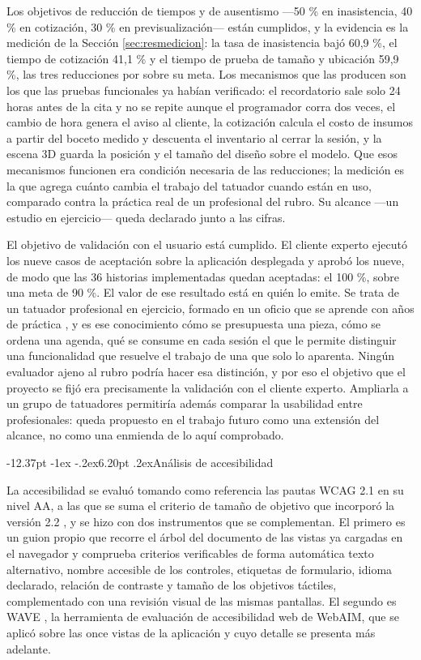 \documentclass[12pt,letterpaper,oneside]{report}
\makeatletter
\renewcommand\section{\@startsection{section}{1}{\z@}%
  {-12.37pt \@plus -1ex \@minus -.2ex}{6.20pt \@plus.2ex}{\normalfont\large\bfseries}}
\makeatother
\begin{document}
Los objetivos de reducción de tiempos y de ausentismo —50 \% en inasistencia, 40 \% en cotización, 30 \% en previsualización— están cumplidos, y la evidencia es la medición de la Sección \ref{sec:resmedicion}: la tasa de inasistencia bajó 60,9 \%, el tiempo de cotización 41,1 \% y el tiempo de prueba de tamaño y ubicación 59,9 \%, las tres reducciones por sobre su meta. Los mecanismos que las producen son los que las pruebas funcionales ya habían verificado: el recordatorio sale solo 24 horas antes de la cita y no se repite aunque el programador corra dos veces, el cambio de hora genera el aviso al cliente, la cotización calcula el costo de insumos a partir del boceto medido y descuenta el inventario al cerrar la sesión, y la escena 3D guarda la posición y el tamaño del diseño sobre el modelo. Que esos mecanismos funcionen era condición necesaria de las reducciones; la medición es la que agrega cuánto cambia el trabajo del tatuador cuando están en uso, comparado contra la práctica real de un profesional del rubro. Su alcance —un estudio en ejercicio— queda declarado junto a las cifras.

El objetivo de validación con el usuario está cumplido. El cliente experto ejecutó los nueve casos de aceptación sobre la aplicación desplegada y aprobó los nueve, de modo que las 36 historias implementadas quedan aceptadas: el 100 \%, sobre una meta de 90 \%. El valor de ese resultado está en quién lo emite. Se trata de un tatuador profesional en ejercicio, formado en un oficio que se aprende con años de práctica \cite{munoz2022tatuadora}, y es ese conocimiento cómo se presupuesta una pieza, cómo se ordena una agenda, qué se consume en cada sesión el que le permite distinguir una funcionalidad que resuelve el trabajo de una que solo lo aparenta. Ningún evaluador ajeno al rubro podría hacer esa distinción, y por eso el objetivo que el proyecto se fijó era precisamente la validación con el cliente experto. Ampliarla a un grupo de tatuadores permitiría además comparar la usabilidad entre profesionales: queda propuesto en el trabajo futuro como una extensión del alcance, no como una enmienda de lo aquí comprobado.



\section{Análisis de accesibilidad}
\label{sec:accesibilidad}

La accesibilidad se evaluó tomando como referencia las pautas WCAG 2.1 \cite{wcag21} en su nivel AA, a las que se suma el criterio de tamaño de objetivo que incorporó la versión 2.2 \cite{wcag22}, y se hizo con dos instrumentos que se complementan. El primero es un guion propio que recorre el árbol del documento de las vistas ya cargadas en el navegador y comprueba criterios verificables de forma automática texto alternativo, nombre accesible de los controles, etiquetas de formulario, idioma declarado, relación de contraste y tamaño de los objetivos táctiles, complementado con una revisión visual de las mismas pantallas. El segundo es WAVE \cite{wave}, la herramienta de evaluación de accesibilidad web de WebAIM, que se aplicó sobre las once vistas de la aplicación y cuyo detalle se presenta más adelante.
\end{document}
